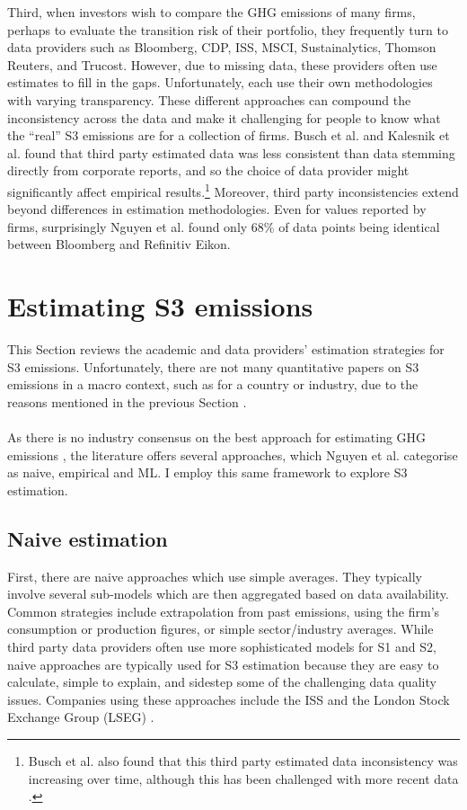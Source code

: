 \documentclass[12pt,twoside]{report}
\begin{document}
Third, when investors wish to compare the GHG emissions of many firms, perhaps to evaluate the transition risk of their portfolio, they frequently turn to data providers such as Bloomberg, CDP, ISS, MSCI, Sustainalytics, Thomson Reuters, and Trucost. However, due to missing data, these providers often use estimates to fill in the gaps. Unfortunately, each use their own methodologies with varying transparency. These different approaches can compound the inconsistency across the data and make it challenging for people to know what the ``real'' S3 emissions are for a collection of firms. Busch et al. \cite{Busch2022} and Kalesnik et al. \cite{KalesnikVitali2022}  found that third party estimated data was less consistent than data stemming directly from corporate reports, and so the choice of data provider might significantly affect empirical results.\footnote{Busch et al. also found that this third party estimated data inconsistency was increasing over time, although this has been challenged with more recent data \cite{Swinkels2024}.} Moreover, third party inconsistencies extend beyond differences in estimation methodologies. Even for values reported by firms, surprisingly Nguyen et al. \cite{Nguyenetal2023} found only 68\% of data points being identical between Bloomberg and Refinitiv Eikon. 

\section{Estimating S3 emissions}\label{sec:Scope3Modelling}

This Section reviews the academic and data providers' estimation strategies for S3 emissions. Unfortunately, there are not many quantitative papers on S3 emissions in a macro context, such as for a country or industry, due to the reasons mentioned in the previous Section \cite{Hettler2024}.  
\\ \\
As there is no industry consensus on the best approach for estimating GHG emissions \cite{FTSERussell2022}, the literature offers several approaches, which Nguyen et al. \cite{nguyen2021} categorise as naive, empirical and ML. I employ this same framework to explore S3 estimation. 

\subsection{Naive estimation}
First, there are naive approaches which use simple averages. They typically involve several sub-models which are then aggregated based on data availability. Common strategies include extrapolation from past emissions, using the firm's consumption or production figures, or simple sector/industry averages. While third party data providers often use more sophisticated models for S1 and S2, naive approaches are typically used for S3 estimation because they are easy to calculate, simple to explain, and sidestep some of the challenging data quality issues. Companies using these approaches include the ISS \cite{iss2023} and the London Stock Exchange Group (LSEG) \cite{lseg2023}.
\end{document}
